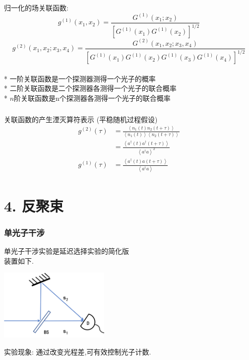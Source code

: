    \begin{frame} 
    \frametitle{}
    归一化的场关联函数:
        \[g^{(1)} (x_1,x_2)= \frac{G^{(1)}(x_1; x_2) }{[G^{(1)}(x_1) G^{(1)}(x_2)]^{1/2} }\]
        \[g^{(2)} (x_1, x_2; x_3,x_4)= \frac{G^{(2)}(x_1,x_2; x_3, x_4) }{[G^{(1)}(x_1) G^{(1)}(x_2)G^{(1)}(x_3) G^{(1)}(x_4)]^{1/2} }\]
    ~\\ {\vspace*{1.3em}}
   * 一阶关联函数是一个探测器测得一个光子的概率\\ 
   * 二阶关联函数是二个探测器各测得一个光子的联合概率 \\ 
   * $n$阶关联函数是n个探测器各测得一个光子的联合概率 
   \end{frame}
\begin{frame} [label=current] 
\frametitle{}
    关联函数的产生湮灭算符表示 (平稳随机过程假设)
    \[ \begin{aligned}
        g^{(2)}(\tau) 
        &=  \frac{\left\langle n_1 (t)  n_2 (t+ \tau)\right\rangle}{\left\langle n_1 (t)\right\rangle \left\langle n_2 (t+ \tau)\right\rangle} \\ 
        &=  \frac{\left\langle a^{\dagger} (t)  a^{\dagger} (t+ \tau)\right\rangle}{\left\langle a^{\dagger} a \right\rangle ^2} \\
        g^{(1)}(\tau) &=  \frac{\left\langle a^{\dagger} (t)  a (t+ \tau)\right\rangle}{\left\langle a^{\dagger} a \right\rangle } \\
    \end{aligned}\] 
\end{frame}

\section{4. 反聚束}

   \begin{frame} 
    \frametitle{单光子干涉}
        单光子干涉实验是延迟选择实验的简化版\\ 
        装置如下.
          \begin{center}
               \includegraphics[width=0.4\textwidth]{figs/19.png}
          \end{center}
        实验现象: 通过改变光程差,可有效控制光子计数.
   \end{frame}

